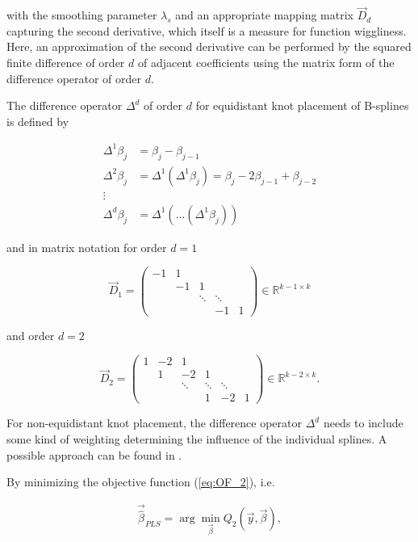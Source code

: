 \documentclass[10pt,a4paper]{report}
\begin{document}
with the smoothing parameter $\lambda_s$ and an appropriate mapping matrix $\vec{D}_d$ capturing the second derivative, which itself is a measure for function wiggliness. Here, an approximation of the second derivative can be performed by the squared finite difference of order $d$ of adjacent coefficients using the matrix form of the difference operator of order $d$. 

The difference operator  $\Delta^d$ of order $d$ for equidistant knot placement of B-splines is defined by

\begin{align*}
	\Delta^1 \beta_j &= \beta_j - \beta_{j-1} \\
	\Delta^2 \beta_j &= \Delta^1(\Delta^1 \beta_j) = \beta_j - 2\beta_{j-1} + \beta_{j-2} \\ 
	\vdots \\ 
	\Delta^d \beta_j &= \Delta^1(...(\Delta^1 \beta_j))
\end{align*}

and in matrix notation for order $d=1$

$$\vec{D}_1 = 
\begin{pmatrix} 
	-1& 1&       &        &   \\  
	&-1& 1     &        &   \\  
	&  &\ddots & \ddots &   \\ 
	&  &       & -1     & 1 
\end{pmatrix} \in \mathbb R^{k-1\times k}$$

and order $d=2$

$$\vec{D}_2 = 
\begin{pmatrix} 
	1& -2& 1& &    \\  
	& 1 & -2 & 1& \\ 
	&  & \ddots & \ddots  & \ddots \\ 
	& & & 1 & -2 & 1 
\end{pmatrix} \in \mathbb R^{k-2\times k}.$$

For non-equidistant knot placement, the difference operator $\Delta^d$ needs to include some kind of weighting determining the influence of the individual splines. A possible approach can be found in \cite{ferziger2008numerische}.

By minimizing the objective function (\ref{eq:OF_2}), i.e.

\begin{align}\label{eq:optimization_problem_2}
	\vec{\hat \beta}_{PLS} = \arg \min_{\vec{\beta}} Q_2(\vec{y}, \vec{\beta}),
\end{align}
\end{document}
